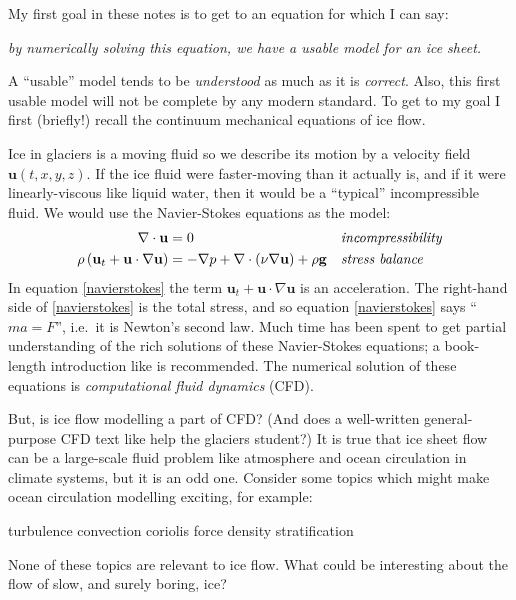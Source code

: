 \documentclass[letterpaper,final,12pt,reqno]{amsart}
\begin{document}
My first goal in these notes is to get to an equation for which I can say:
\begin{center}
\emph{by numerically solving this equation, we have a usable model for an ice sheet.}
\end{center}
\noindent A ``usable'' model tends to be \emph{understood} as much as it is \emph{correct}.  Also, this first usable model will not be complete by any modern standard.  To get to my goal I first (briefly!) recall the continuum mechanical equations of ice flow.

Ice in glaciers is a moving fluid so we describe its motion by a velocity field $\mathbf{u}(t,x,y,z)$.  If the ice fluid were faster-moving than it actually is, and if it were linearly-viscous like liquid water, then it would be a ``typical'' incompressible fluid.  We would use the Navier-Stokes equations as the model:
\begin{align}
\nabla \cdot \mathbf{u} &= 0 &&\text{\emph{incompressibility}} \label{incompressible} \\
\rho \left(\mathbf{u}_t + \mathbf{u}\cdot\nabla \mathbf{u}\right) &= -\nabla p + \nabla \cdot (\nu \nabla \mathbf{u}) + \rho \mathbf{g} &&\text{\emph{stress balance}} \label{navierstokes}
\end{align}
In equation \eqref{navierstokes} the term $\mathbf{u}_t + \mathbf{u}\cdot\nabla \mathbf{u}$ is an acceleration.  The right-hand side of \eqref{navierstokes} is the total stress, and so equation \eqref{navierstokes} says ``$ma=F$'', i.e.~it is Newton's second law.  Much time has been spent to get partial understanding of the rich solutions of these Navier-Stokes equations; a book-length introduction like \cite{Acheson} is recommended.  The numerical solution of these equations is \emph{computational fluid dynamics} (CFD).

But, is ice flow modelling a part of CFD?  (And does a well-written general-purpose CFD text like \cite{Wesseling} help the glaciers student?)  It is true that ice sheet flow can be a large-scale fluid problem like atmosphere and ocean circulation in climate systems, but it is an odd one.  Consider some topics which might make ocean circulation modelling exciting, for example:
  \begin{center} turbulence \qquad convection \qquad  coriolis force  \qquad density stratification
  \end{center}
None of these topics are relevant to ice flow.  What could be interesting about the flow of slow, and surely boring, ice?
\end{document}
